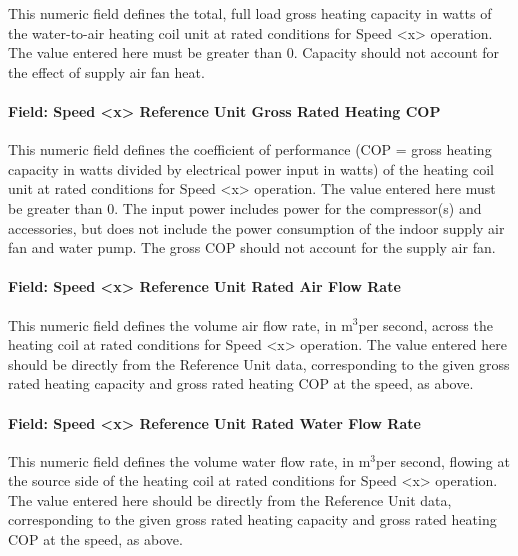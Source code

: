 This numeric field defines the total, full load gross heating capacity in watts of the water-to-air heating coil unit at rated conditions for Speed \textless{}x\textgreater{} operation. The value entered here must be greater than 0. Capacity should not account for the effect of supply air fan heat.

\paragraph{Field: Speed \textless{}x\textgreater{} Reference Unit Gross Rated Heating COP}\label{field-speed-x-reference-unit-gross-rated-heating-cop-1}

This numeric field defines the coefficient of performance (COP = gross heating capacity in watts divided by electrical power input in watts) of the heating coil unit at rated conditions for Speed \textless{}x\textgreater{} operation. The value entered here must be greater than 0. The input power includes power for the compressor(s) and accessories, but does not include the power consumption of the indoor supply air fan and water pump. The gross COP should not account for the supply air fan.

\paragraph{Field: Speed \textless{}x\textgreater{} Reference Unit Rated Air Flow Rate}\label{field-speed-x-reference-unit-rated-air-flow-rate-3}

This numeric field defines the volume air flow rate, in m\(^{3}\)per second, across the heating coil at rated conditions for Speed \textless{}x\textgreater{} operation. The value entered here should be directly from the Reference Unit data, corresponding to the given gross rated heating capacity and gross rated heating COP at the speed, as above.

\paragraph{Field: Speed \textless{}x\textgreater{} Reference Unit Rated Water Flow Rate}\label{field-speed-x-reference-unit-rated-water-flow-rate-1}

This numeric field defines the volume water flow rate, in m\(^{3}\)per second, flowing at the source side of the heating coil at rated conditions for Speed \textless{}x\textgreater{} operation. The value entered here should be directly from the Reference Unit data, corresponding to the given gross rated heating capacity and gross rated heating COP at the speed, as above.

